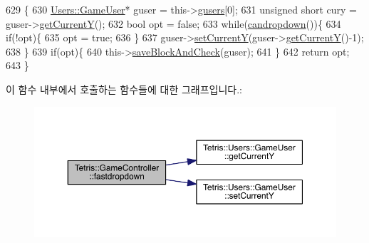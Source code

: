 \begin{DoxyCode}
629                                \{
630                 \hyperlink{class_tetris_1_1_users_1_1_game_user}{Users::GameUser}* guser = this->\hyperlink{class_tetris_1_1_game_controller_a1a31d3a933daad6d95e20458eea2900e}{gusers}[0];
631                 \textcolor{keywordtype}{unsigned} \textcolor{keywordtype}{short} cury = guser->\hyperlink{class_tetris_1_1_users_1_1_game_user_af5bd7ff0b575af1b42b093488cff97e2}{getCurrentY}();
632                 \textcolor{keywordtype}{bool} opt = \textcolor{keyword}{false};
633                 \textcolor{keywordflow}{while}(\hyperlink{class_tetris_1_1_game_controller_ac4993d5ad8640ac617fec341fdb301ee}{candropdown}())\{
634                     \textcolor{keywordflow}{if}(!opt)\{
635                         opt = \textcolor{keyword}{true};
636                     \}
637                     guser->\hyperlink{class_tetris_1_1_users_1_1_game_user_aeedbe521004c22018b73a509e99f7d81}{setCurrentY}(guser->\hyperlink{class_tetris_1_1_users_1_1_game_user_af5bd7ff0b575af1b42b093488cff97e2}{getCurrentY}()-1);
638                 \}
639                 \textcolor{keywordflow}{if}(opt)\{
640                     this->\hyperlink{class_tetris_1_1_game_controller_a3c63a9754e4cbeae4f66a5760bb4055d}{saveBlockAndCheck}(guser);
641                 \}
642                 \textcolor{keywordflow}{return} opt;
643             \}
\end{DoxyCode}
이 함수 내부에서 호출하는 함수들에 대한 그래프입니다.\+:
\nopagebreak
\begin{figure}[H]
\begin{center}
\leavevmode
\includegraphics[width=350pt]{db/dd2/class_tetris_1_1_game_controller_a8d5b65ec7638519a39b4ba8a71e67fff_cgraph}
\end{center}
\end{figure}
\mbox{\label{class_tetris_1_1_game_controller_ab19e8563acc9e724e130de60f87600b7}} 
